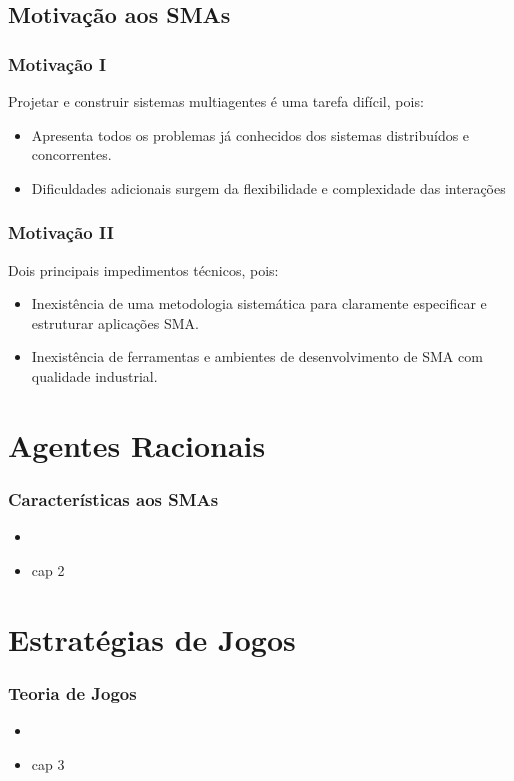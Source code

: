 \documentclass[10pt]{beamer}
\begin{document}
\subsection{Motivação aos SMAs}
\begin{frame}

    \frametitle{Motivação I}
    Projetar e construir sistemas multiagentes é uma tarefa difícil, pois:
    \begin{itemize}
    \pause
      \item Apresenta todos os problemas já conhecidos 
dos sistemas distribuídos e concorrentes.
\pause
      \item Dificuldades adicionais surgem da flexibilidade 
e complexidade das interações
    
    \end{itemize}
\end{frame}



\begin{frame}

    \frametitle{Motivação II}
   Dois principais impedimentos técnicos, pois:
    \begin{itemize}
    \pause
      \item Inexistência de uma metodologia sistemática para claramente especificar e estruturar aplicações SMA.
\pause
      \item Inexistência de ferramentas e ambientes de 
desenvolvimento de SMA com qualidade industrial.
    
    \end{itemize}
\end{frame}




\section{Agentes Racionais}
\begin{frame}

    \frametitle{Características aos SMAs}
    \begin{itemize}
    \pause
      \item 
\pause
      \item cap 2
    
    \end{itemize}
\end{frame}


\section{Estratégias de Jogos}
\begin{frame}

    \frametitle{Teoria de Jogos}
    \begin{itemize}
    \pause
      \item 
\pause
      \item cap 3
    
    \end{itemize}
\end{frame}
\end{document}
